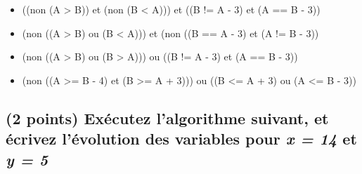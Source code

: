 \documentclass[11pt,a4paper]{article}
\begin{document}
\begin{itemize}
  \item[\CaseCoche] ((non (A > B)) et (non (B < A))) et ((B != A - 3) et (A == B - 3)) \\ %
  \item[\CaseCoche] (non ((A > B) ou (B < A))) et (non ((B == A - 3) et (A != B - 3)) \\ %
  \item[\CaseCoche] (non ((A > B) ou (B > A))) ou ((B != A - 3) et (A == B - 3)) \\ %
  \item[\CaseCoche] (non ((A >= B - 4) et (B >= A + 3))) ou ((B <= A + 3) ou (A <= B - 3)) \\ %
\end{itemize}


\bigskip


\subsection{(2 points) Exécutez l'algorithme suivant, et écrivez l'évolution des variables pour \textit{x = 14} et \textit{y = 5} }

\bigskip
\end{document}
